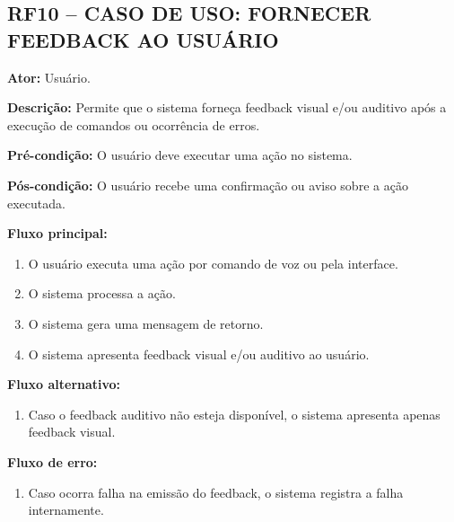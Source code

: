 \documentclass[12pt,oneside,a4paper,brazil,final]{abntex2}
\begin{document}
\clearpage
\subsection*{RF10 -- CASO DE USO: FORNECER FEEDBACK AO USUÁRIO}



\textbf{Ator:} Usuário.



\textbf{Descrição:} Permite que o sistema forneça feedback visual e/ou auditivo após a execução de comandos ou ocorrência de erros.



\textbf{Pré-condição:} O usuário deve executar uma ação no sistema.



\textbf{Pós-condição:} O usuário recebe uma confirmação ou aviso sobre a ação executada.



\textbf{Fluxo principal:}

\begin{enumerate}

    \item O usuário executa uma ação por comando de voz ou pela interface.

    \item O sistema processa a ação.

    \item O sistema gera uma mensagem de retorno.

    \item O sistema apresenta feedback visual e/ou auditivo ao usuário.

\end{enumerate}



\textbf{Fluxo alternativo:}

\begin{enumerate}

    \item Caso o feedback auditivo não esteja disponível, o sistema apresenta apenas feedback visual.

\end{enumerate}



\textbf{Fluxo de erro:}

\begin{enumerate}

    \item Caso ocorra falha na emissão do feedback, o sistema registra a falha internamente.

\end{enumerate}
\end{document}

